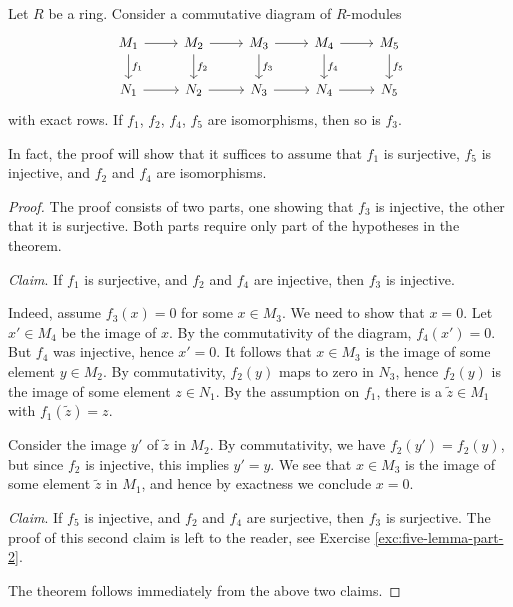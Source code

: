 \begin{theorem}\label{thm:five-lemma}
Let $R$ be a ring. Consider a commutative diagram of $R$-modules
\[
\begin{tikzcd}
	M_1 \arrow{r} \arrow{d}{f_1}
	& M_2 \arrow{r} \arrow{d}{f_2}
	& M_3 \arrow{r} \arrow{d}{f_3}
	& M_4 \arrow{r} \arrow{d}{f_4}
	& M_5  \arrow{d}{f_5} \\
	N_1 \arrow{r}
	& N_2 \arrow{r}
	& N_3 \arrow{r}
	& N_4 \arrow{r}
	& N_5 
\end{tikzcd}
\]
with exact rows. If $f_1$, $f_2$, $f_4$, $f_5$ are isomorphisms, then so is $f_3$.
\end{theorem}

In fact, the proof will show that it suffices to assume that $f_1$ is surjective, $f_5$ is injective, and $f_2$ and $f_4$ are isomorphisms.


\begin{proof}The proof consists of two parts, one showing that $f_3$ is injective, the other that it is surjective. Both parts require only part of the hypotheses in the theorem.

\emph{Claim}. If $f_1$ is surjective, and $f_2$ and $f_4$ are injective, then $f_3$ is injective.

Indeed, assume $f_3(x)=0$ for some $x\in M_3$. We need to show that $x=0$. Let $x'\in M_4$ be the image of $x$. By the commutativity of the diagram, $f_4(x')=0$. But $f_4$ was injective, hence $x'=0$. It follows that $x\in M_3$ is the image of some element $y\in M_2$.  By commutativity, $f_2(y)$ maps to zero in $N_3$, hence $f_2(y)$ is the image of some element $z \in N_1$. By the assumption on $f_1$, there is a $\tilde{z} \in M_1$ with $f_1(\tilde{z})=z$. 

Consider the image $y'$ of $\tilde{z}$ in $M_2$. By commutativity, we have $f_2(y')=f_2(y)$, but since $f_2$ is injective, this implies $y'=y$. We see that $x\in M_3$ is the image of some element $\tilde{z}$ in $M_1$, and hence by exactness we conclude $x=0$.

\emph{Claim}. If $f_5$ is injective, and $f_2$ and $f_4$ are surjective, then $f_3$ is surjective.
The proof of this second claim is left to the reader, see Exercise \ref{exc:five-lemma-part-2}.

The theorem follows immediately from the above two claims.
\end{proof}


